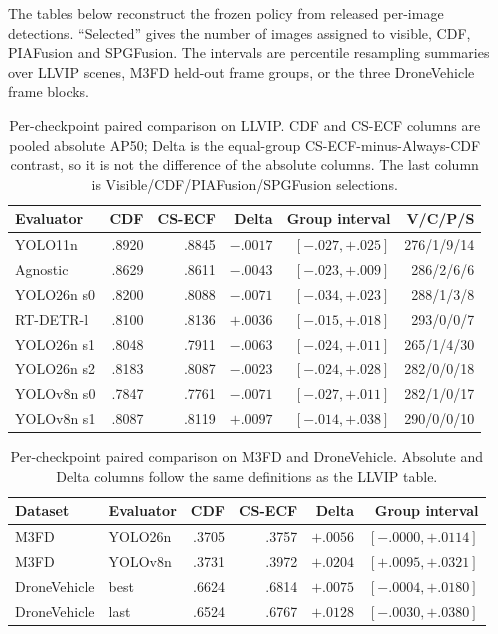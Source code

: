 \documentclass[11pt]{article}
\begin{document}
The tables below reconstruct the frozen policy from released per-image
detections. ``Selected'' gives the number of images assigned to visible, CDF,
PIAFusion and SPGFusion. The intervals are percentile resampling summaries over
LLVIP scenes, M3FD held-out frame groups, or the three DroneVehicle frame
blocks.

\begin{table}[ht]
\centering
\small
\caption{Per-checkpoint paired comparison on LLVIP. CDF and CS-ECF columns are
pooled absolute AP50; Delta is the equal-group CS-ECF-minus-Always-CDF
contrast, so it is not the difference of the absolute columns. The last column
is Visible/CDF/PIAFusion/SPGFusion selections.}
\label{tab:llvip-cdf}
\begin{tabular}{@{}lrrrrr@{}}
\toprule
Evaluator & CDF & CS-ECF & Delta & Group interval & V/C/P/S \\
\midrule
YOLO11n & .8920 & .8845 & \(-.0017\) & \([-.027,+.025]\) & 276/1/9/14 \\
Agnostic & .8629 & .8611 & \(-.0043\) & \([-.023,+.009]\) & 286/2/6/6 \\
YOLO26n s0 & .8200 & .8088 & \(-.0071\) & \([-.034,+.023]\) & 288/1/3/8 \\
RT-DETR-l & .8100 & .8136 & \(+.0036\) & \([-.015,+.018]\) & 293/0/0/7 \\
YOLO26n s1 & .8048 & .7911 & \(-.0063\) & \([-.024,+.011]\) & 265/1/4/30 \\
YOLO26n s2 & .8183 & .8087 & \(-.0023\) & \([-.024,+.028]\) & 282/0/0/18 \\
YOLOv8n s0 & .7847 & .7761 & \(-.0071\) & \([-.027,+.011]\) & 282/1/0/17 \\
YOLOv8n s1 & .8087 & .8119 & \(+.0097\) & \([-.014,+.038]\) & 290/0/0/10 \\
\bottomrule
\end{tabular}
\end{table}

\begin{table}[ht]
\centering
\small
\caption{Per-checkpoint paired comparison on M3FD and DroneVehicle. Absolute
and Delta columns follow the same definitions as the LLVIP table.}
\label{tab:external-cdf}
\begin{tabular}{@{}llrrrr@{}}
\toprule
Dataset & Evaluator & CDF & CS-ECF & Delta & Group interval \\
\midrule
M3FD & YOLO26n & .3705 & .3757 & \(+.0056\) & \([-.0000,+.0114]\) \\
M3FD & YOLOv8n & .3731 & .3972 & \(+.0204\) & \([+.0095,+.0321]\) \\
DroneVehicle & best & .6624 & .6814 & \(+.0075\) & \([-.0004,+.0180]\) \\
DroneVehicle & last & .6524 & .6767 & \(+.0128\) & \([-.0030,+.0380]\) \\
\bottomrule
\end{tabular}
\end{table}
\end{document}
